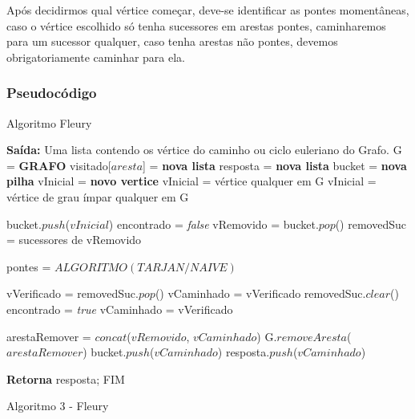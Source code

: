 Após decidirmos qual vértice começar, deve-se identificar as pontes momentâneas, caso o vértice escolhido só tenha sucessores em arestas pontes, caminharemos para um sucessor qualquer, caso tenha arestas não pontes, devemos obrigatoriamente caminhar para ela.

\subsubsection{Pseudocódigo}
 

\begin{center}	
	\vspace{-0.3cm}
\begin{minipage}[ht]{13cm}
\begin{algorithm}[H]
  \footnotesize
  \caption{Algoritmo Fleury}
  \label{alg:2}
  \begin{algorithmic}[2]
     \STATE \textbf{Saída:} Uma lista contendo os vértice do caminho ou ciclo euleriano do Grafo.
     \STATE G = \textbf{GRAFO}
     \STATE visitado[$aresta$] = \textbf{nova lista}
     \STATE resposta = \textbf{nova lista}
     \STATE bucket = \textbf{nova pilha}
     \STATE vInicial = \textbf{novo vertice}
        \STATE vInicial = vértice qualquer em G
     \ELSE
        \STATE vInicial = vértice de grau ímpar qualquer em G
     \ENDIF
     
     \STATE bucket.$push$($vInicial$)
        \STATE encontrado = \textit{false}
        \STATE vRemovido = bucket.$pop$()
        \STATE removedSuc = sucessores de vRemovido
        
        \STATE pontes = $ALGORITMO (TARJAN/NAIVE)$
        
            \STATE vVerificado = removedSuc.$pop$()
                \STATE vCaminhado = vVerificado
                \STATE removedSuc.$clear$()
                \STATE encontrado = \textit{true}
            \ENDIF
        \ENDWHILE
            \STATE vCaminhado = vVerificado
        \ENDIF
        
        \STATE arestaRemover = $concat$($vRemovido$, $vCaminhado$)
        \STATE G.$removeAresta$($arestaRemover$)
        \STATE bucket.$push$($vCaminhado$)
        \STATE resposta.$push$($vCaminhado$)
        
     \ENDWHILE

    \STATE \textbf{Retorna} resposta; FIM
  \end{algorithmic}
\end{algorithm}
\caption{Algoritmo 3 - Fleury}
\end{minipage}
\end{center}


